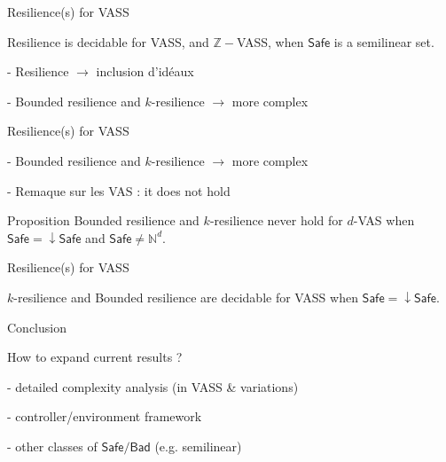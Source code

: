 \documentclass{beamer}
\newcommand{\N}{\mathbb{N}}
\newcommand{\Bad}{\textsf{Bad}}
\newcommand{\Safe}{\textsf{Safe}}
\begin{document}
  \begin{frame}{Resilience(s) for VASS}

\begin{theorem}\label{SL VASS}
{\sc Resilience} is decidable for VASS, and $\mathbb{Z}-$VASS, when $\Safe$  is a semilinear set.
\end{theorem}

- Resilience $\to$ inclusion d'idéaux

- Bounded resilience and $k$-resilience $\to$ more complex
 
   \end{frame}
  \begin{frame}{Resilience(s) for VASS}

- Bounded resilience and $k$-resilience $\to$ more complex
 
- Remaque sur les VAS : it does not hold

\begin{block}{Proposition}
{\sc Bounded resilience} and {\sc $k$-resilience} never hold for $d$-VAS when $\Safe = \mathop{\downarrow} \Safe$ and $\Safe \neq \N^d$.
\end{block}


   \end{frame}
  \begin{frame}{Resilience(s) for VASS}

\begin{theorem}\label{vass down}
{\sc $k$-resilience }  and {\sc Bounded resilience} are decidable for VASS when 
$\Safe = \mathop{\downarrow} \Safe$.
\end{theorem}



  \end{frame}
  \begin{frame}{Conclusion}
  

How to expand current results ?

- detailed complexity analysis (in VASS \& variations)

- controller/environment framework

- other classes of $\Safe / \Bad$ (e.g. semilinear)


  \end{frame}
\end{document}
